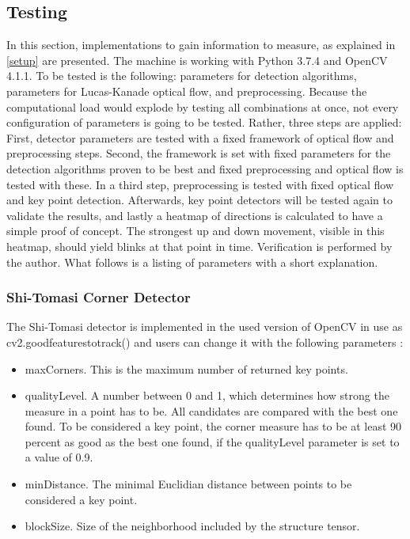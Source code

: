 \documentclass[Bachelorarbeit.tex]{subfiles}
\begin{document}
 

\subsection{Testing}
\label{testing}

In this section, implementations to gain information to measure, as explained in \autoref{setup} are presented. The machine is working with Python 3.7.4 and OpenCV 4.1.1. To be tested is the following: parameters for detection algorithms, parameters for Lucas-Kanade optical flow, and preprocessing. Because the computational load would explode by testing all combinations at once, not every configuration of parameters is going to be tested. Rather, three steps are applied: First, detector parameters are tested with a fixed framework of optical flow and preprocessing steps. Second, the framework is set with fixed parameters for the detection algorithms proven to be best and fixed preprocessing and optical flow is tested with these. In a third step, preprocessing is tested with fixed optical flow and key point detection. Afterwards, key point detectors will be tested again to validate the results, and lastly a heatmap of directions is calculated to have a simple proof of concept. The strongest up and down movement, visible in this heatmap, should yield blinks at that point in time. Verification is performed by the author. What follows is a listing of parameters with a short explanation.

\subsubsection{Shi-Tomasi Corner Detector}
The Shi-Tomasi detector is implemented in the used version of OpenCV in use as cv2.goodfeaturestotrack() and users can change it with the following parameters \citep{itseez2019theopencv}:
\begin{itemize}
	\item maxCorners. This is the maximum number of returned key points.
	\item qualityLevel. A number between 0 and 1, which determines how strong the measure in a point has to be. All candidates are compared with the best one found. To be considered a key point, the corner measure has to be at least 90 percent as good as the best one found, if the qualityLevel parameter is set to a value of 0.9.
	\item minDistance. The minimal Euclidian distance between points to be considered a key point.
	\item blockSize. Size of the neighborhood included by the structure tensor.
\end{itemize}
\end{document}
